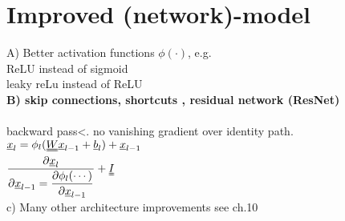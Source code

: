 \section{Improved (network)-model}
A) Better activation functions $  \phi(\cdot) $, e.g. \\
\textbullet ReLU instead of sigmoid \\
\textbullet leaky reLu instead of ReLU\\
\textbf{B) skip connections, shortcuts , residual network (ResNet)}\\
 \\
\textbullet backward pass<. no vanishing gradient over identity path. \\
$  \x_l = \phi_l (\W \x_{l-1} + \b_l )  + \x_{l-1}$\\
$ \dfrac{\partial \x_l}{\partial \x_{l-1} = \dfrac{\partial \phi _l (\cdots)}{\partial \x_{l-1}}} + \II  $\\
c) Many other architecture improvements see ch.10 




 

























